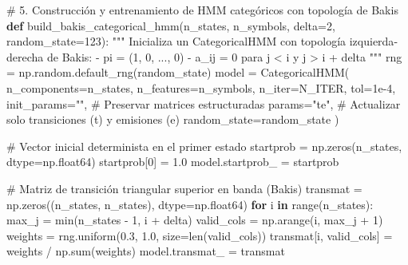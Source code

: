 \documentclass[
  spanish,
  us-letterpaper,
]{scrreprt}
\newenvironment{Shaded}{\begin{snugshade}}{\end{snugshade}}
\newcommand{\BuiltInTok}[1]{\textcolor[rgb]{0.00,0.23,0.31}{#1}}
\newcommand{\CommentTok}[1]{\textcolor[rgb]{0.37,0.37,0.37}{#1}}
\newcommand{\ControlFlowTok}[1]{\textcolor[rgb]{0.00,0.23,0.31}{\textbf{#1}}}
\newcommand{\DecValTok}[1]{\textcolor[rgb]{0.68,0.00,0.00}{#1}}
\newcommand{\FloatTok}[1]{\textcolor[rgb]{0.68,0.00,0.00}{#1}}
\newcommand{\KeywordTok}[1]{\textcolor[rgb]{0.00,0.23,0.31}{\textbf{#1}}}
\newcommand{\NormalTok}[1]{\textcolor[rgb]{0.00,0.23,0.31}{#1}}
\newcommand{\OperatorTok}[1]{\textcolor[rgb]{0.37,0.37,0.37}{#1}}
\newcommand{\StringTok}[1]{\textcolor[rgb]{0.13,0.47,0.30}{#1}}
\theoremstyle{definition}
\theoremstyle{remark}
\begin{document}
\label{hmm-entrenamiento-evaluacion}
\begin{Shaded}
\begin{Highlighting}[]
\CommentTok{\# 5. Construcción y entrenamiento de HMM categóricos con topología de Bakis}
\KeywordTok{def}\NormalTok{ build\_bakis\_categorical\_hmm(n\_states, n\_symbols, delta}\OperatorTok{=}\DecValTok{2}\NormalTok{, random\_state}\OperatorTok{=}\DecValTok{123}\NormalTok{):}
    \CommentTok{"""}
\CommentTok{    Inicializa un CategoricalHMM con topología izquierda{-}derecha de Bakis:}
\CommentTok{    {-} pi = (1, 0, ..., 0)}
\CommentTok{    {-} a\_ij = 0 para j \textless{} i y j \textgreater{} i + delta}
\CommentTok{    """}
\NormalTok{    rng }\OperatorTok{=}\NormalTok{ np.random.default\_rng(random\_state)}
\NormalTok{    model }\OperatorTok{=}\NormalTok{ CategoricalHMM(}
\NormalTok{        n\_components}\OperatorTok{=}\NormalTok{n\_states,}
\NormalTok{        n\_features}\OperatorTok{=}\NormalTok{n\_symbols,}
\NormalTok{        n\_iter}\OperatorTok{=}\NormalTok{N\_ITER,}
\NormalTok{        tol}\OperatorTok{=}\FloatTok{1e{-}4}\NormalTok{,}
\NormalTok{        init\_params}\OperatorTok{=}\StringTok{""}\NormalTok{,   }\CommentTok{\# Preservar matrices estructuradas}
\NormalTok{        params}\OperatorTok{=}\StringTok{"te"}\NormalTok{,      }\CommentTok{\# Actualizar solo transiciones (t) y emisiones (e)}
\NormalTok{        random\_state}\OperatorTok{=}\NormalTok{random\_state}
\NormalTok{    )}

    \CommentTok{\# Vector inicial determinista en el primer estado}
\NormalTok{    startprob }\OperatorTok{=}\NormalTok{ np.zeros(n\_states, dtype}\OperatorTok{=}\NormalTok{np.float64)}
\NormalTok{    startprob[}\DecValTok{0}\NormalTok{] }\OperatorTok{=} \FloatTok{1.0}
\NormalTok{    model.startprob\_ }\OperatorTok{=}\NormalTok{ startprob}

    \CommentTok{\# Matriz de transición triangular superior en banda (Bakis)}
\NormalTok{    transmat }\OperatorTok{=}\NormalTok{ np.zeros((n\_states, n\_states), dtype}\OperatorTok{=}\NormalTok{np.float64)}
    \ControlFlowTok{for}\NormalTok{ i }\KeywordTok{in} \BuiltInTok{range}\NormalTok{(n\_states):}
\NormalTok{        max\_j }\OperatorTok{=} \BuiltInTok{min}\NormalTok{(n\_states }\OperatorTok{{-}} \DecValTok{1}\NormalTok{, i }\OperatorTok{+}\NormalTok{ delta)}
\NormalTok{        valid\_cols }\OperatorTok{=}\NormalTok{ np.arange(i, max\_j }\OperatorTok{+} \DecValTok{1}\NormalTok{)}
\NormalTok{        weights }\OperatorTok{=}\NormalTok{ rng.uniform(}\FloatTok{0.3}\NormalTok{, }\FloatTok{1.0}\NormalTok{, size}\OperatorTok{=}\BuiltInTok{len}\NormalTok{(valid\_cols))}
\NormalTok{        transmat[i, valid\_cols] }\OperatorTok{=}\NormalTok{ weights }\OperatorTok{/}\NormalTok{ np.}\BuiltInTok{sum}\NormalTok{(weights)}
\NormalTok{    model.transmat\_ }\OperatorTok{=}\NormalTok{ transmat}


\end{Highlighting}
\end{Shaded}
\end{document}
